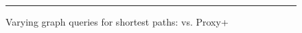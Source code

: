 \begin{figure}[t!]
\begin{center}
\end{center}
\caption{Varying graph queries for shortest paths: \ah vs. Proxy+\ah}
\label{fig:performance_path_queries_ah}
\hrule
\vspace{-2ex}
\end{figure}



